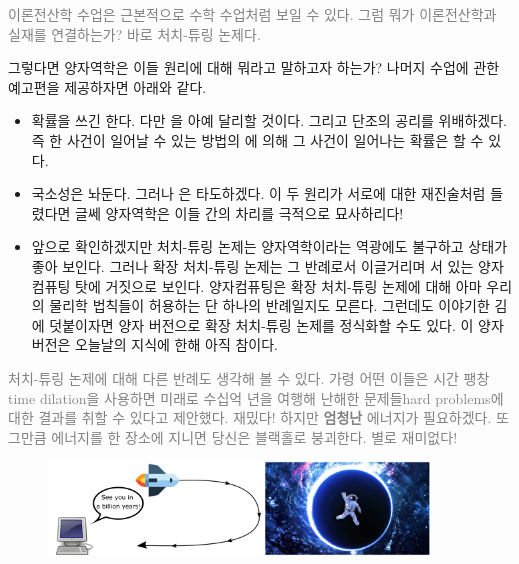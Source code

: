 \documentclass[a4paper,chapter,atbegshi,hidelinks]{oblivoir}
\begin{document}
\hfill

\hfill\parbox[t]{9cm}{\textcolor{gray}{이론전산학 수업은 근본적으로 수학 수업처럼
보일 수 있다. 그럼 뭐가 이론전산학과 실재를 연결하는가? 바로 처치-튜링 논제다.}}

\hfill\break

그렇다면 양자역학은 이들 원리에 대해 뭐라고 말하고자 하는가? 나머지 수업에 관한
예고편을 제공하자면 아래와 같다.

\hfill

\begin{itemize}[label=$\blacktriangleright$]
    \item 확률을 쓰긴 한다. 다만 을 아예
        달리할 것이다. 그리고 단조의 공리를 위배하겠다. 즉 한 사건이
        일어날 수 있는 방법의 에 의해 그 사건이 일어나는 확률은
        할 수 있다.
    \item 국소성은 놔둔다. 그러나 은 타도하겠다. 이 두
        원리가 서로에 대한 재진술처럼 들렸다면 글쎄 양자역학은 이들 간의 차리를
        극적으로 묘사하리다!
    \item 앞으로 확인하겠지만 처치-튜링 논제는 양자역학이라는 역광에도 불구하고
        상태가 좋아 보인다. 그러나 확장 처치-튜링 논제는 그 반례로서 이글거리며
        서 있는 양자컴퓨팅 탓에 거짓으로 보인다. 양자컴퓨팅은 확장 처치-튜링 
        논제에 대해 아마 우리의 물리학 법칙들이 허용하는 단 하나의 반례일지도
        모른다. 그런데도 이야기한 김에 덧붙이자면 양자 버전으로 확장 처치-튜링
        논제를 정식화할 수도 있다. 이 양자 버전은 오늘날의 지식에 한해 아직 
        참이다.
\end{itemize}

\hfill\break

\hfill\parbox[t]{9cm}{\textcolor{gray}{ 처치-튜링 논제에 대해 다른
반례도 생각해 볼 수 있다. 가령 어떤 이들은 시간 팽창{\footnotesize time 
dilation}을 사용하면 미래로 수십억 년을 여행해 난해한 문제들{\footnotesize hard
problems}에 대한 결과를 취할 수 있다고 제안했다. 재밌다! 하지만 \textbf{엄청난}
에너지가 필요하겠다. 또 그만큼 에너지를 한 장소에 지니면 당신은 블랙홀로
붕괴한다. 별로 재미없다!}}

\hfill\break

\begin{figure}[h]
    \centering
    \includegraphics[width=0.9\textwidth]{iqis1_003}
\end{figure}
\end{document}
